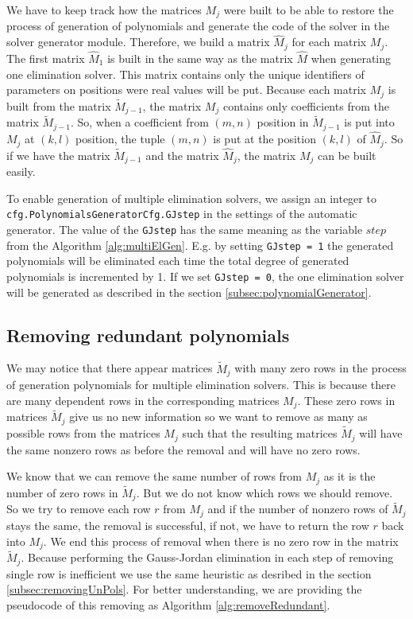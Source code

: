 

We have to keep track how the matrices $M_j$ were built to be able to restore the process of generation of polynomials and generate the code of the solver in the solver generator module. Therefore, we build a matrix $\hat{M}_j$ for each matrix $M_j$. The first matrix $\hat{M}_1$ is built in the same way as the matrix $\hat{M}$ when generating one elimination solver. This matrix contains only the unique identifiers of parameters on positions were real values will be put. Because each matrix $M_j$ is built from the matrix $\tilde{M}_{j-1}$, the matrix $M_j$ contains only coefficients from the matrix $\tilde{M}_{j-1}$. So, when a coefficient from $(m,n)$ position in $\tilde{M}_{j-1}$ is put into $M_j$ at $(k, l)$ position, the tuple $(m, n)$ is put at the position $(k, l)$ of $\hat{M}_j$. So if we have the matrix $\tilde{M}_{j-1}$ and the matrix $\hat{M}_j$, the matrix $M_j$ can be built easily.

To enable generation of multiple elimination solvers, we assign an integer to \texttt{cfg.Poly\-nomials\-Gene\-rator\-Cfg.GJstep} in the settings of the automatic generator. The value of the \texttt{GJstep} has the same meaning as the variable $step$ from the Algorithm \ref{alg:multiElGen}. E.g. by setting \texttt{GJstep = 1} the generated polynomials will be eliminated each time the total degree of generated polynomials is incremented by 1. If we set \texttt{GJstep = 0}, the one elimination solver will be generated as described in the section \ref{subsec:polynomialGenerator}.

\subsection{Removing redundant polynomials}
\label{subsec:removeRedundant}
We may notice that there appear matrices $\tilde{M}_j$ with many zero rows in the process of generation polynomials for multiple elimination solvers. This is because there are many dependent rows in the corresponding matrices $M_j$. These zero rows in matrices $\tilde{M}_j$ give us no new information so we want to remove as many as possible rows from the matrices $M_j$ such that the resulting matrices $\tilde{M}_j$ will have the same nonzero rows as before the removal and will have no zero rows.

We know that we can remove the same number of rows from $M_j$ as it is the number of zero rows in $\tilde{M}_j$. But we do not know which rows we should remove. So we try to remove each row $r$ from $M_j$ and if the number of nonzero rows of $\tilde{M}_j$ stays the same, the removal is successful, if not, we have to return the row $r$ back into $M_j$. We end this process of removal when there is no zero row in the matrix $\tilde{M}_j$. Because performing the Gauss-Jordan elimination in each step of removing single row is inefficient we use the same heuristic as desribed in the section \ref{subsec:removingUnPols}. For better understanding, we are providing the pseudocode of this removing as Algorithm \ref{alg:removeRedundant}.

